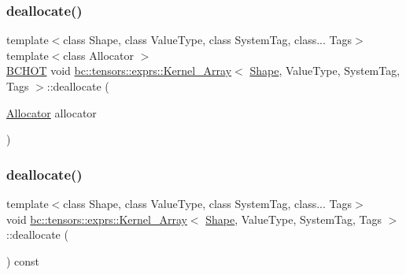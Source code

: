 \mbox{\label{structbc_1_1tensors_1_1exprs_1_1Kernel__Array_a60aebb03b7b8f71975e0d71d43c37087}} 
\subsubsection{\texorpdfstring{deallocate()}{deallocate()}\hspace{0.1cm}{\footnotesize\ttfamily [1/2]}}
{\footnotesize\ttfamily template$<$class Shape, class Value\+Type, class System\+Tag, class... Tags$>$ \\
template$<$class Allocator $>$ \\
\hyperlink{common_8h_ac085f07cc309e3aac24aa3fc0a40f6d2}{B\+C\+H\+OT} void \hyperlink{structbc_1_1tensors_1_1exprs_1_1Kernel__Array}{bc\+::tensors\+::exprs\+::\+Kernel\+\_\+\+Array}$<$ \hyperlink{structbc_1_1Shape}{Shape}, Value\+Type, System\+Tag, Tags $>$\+::deallocate (\begin{DoxyParamCaption}\item[{\hyperlink{classbc_1_1allocators_1_1Allocator}{Allocator}}]{allocator }\end{DoxyParamCaption})\hspace{0.3cm}{\ttfamily [inline]}}

\mbox{\label{structbc_1_1tensors_1_1exprs_1_1Kernel__Array_aaa57ddd4b0a9f13a27c80d2ecaf38781}} 
\subsubsection{\texorpdfstring{deallocate()}{deallocate()}\hspace{0.1cm}{\footnotesize\ttfamily [2/2]}}
{\footnotesize\ttfamily template$<$class Shape, class Value\+Type, class System\+Tag, class... Tags$>$ \\
void \hyperlink{structbc_1_1tensors_1_1exprs_1_1Kernel__Array}{bc\+::tensors\+::exprs\+::\+Kernel\+\_\+\+Array}$<$ \hyperlink{structbc_1_1Shape}{Shape}, Value\+Type, System\+Tag, Tags $>$\+::deallocate (\begin{DoxyParamCaption}{ }\end{DoxyParamCaption}) const\hspace{0.3cm}{\ttfamily [inline]}}

